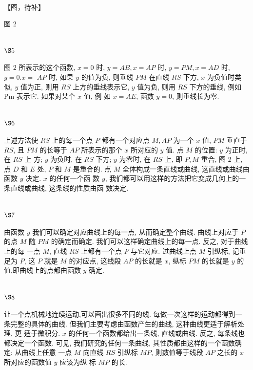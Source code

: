 【图，待补】

图 2

\section{$\S 5$}

图 2 所表示的这个函数, $x=0$ 时, $y=A B, x=A P$ 时, $y=P M, x=A D$ 时, $y=0 . x=$ $A P$ 时, 如果 $y$ 的值为负, 则垂线 $P M$ 在直线 $R S$ 下方, $x$ 为负值时类似, $y$ 值为正, 则用 $R S$ 上方的垂线表示它, $y$ 值为负, 则用 $R S$ 下方的垂线, 例如 Pm 表示它. 如果对某个 $x$ 值, 例 如 $x=A E$, 函数 $y=0$, 则垂线长为零.

\section{$\S 6$}

上述方法使 $R S$ 上的每一个点 $P$ 都有一个对应点 $M, A P$ 为一个 $x$ 值, $P M$ 垂直于 $R S$, 且 $P M$ 的长等于 $A P$ 所表示的那个 $x$ 所对应的 $y$ 值. 点 $M$ 的位置: $y$ 为正时,在 $R S$ 上 方; $y$ 为负时, 在 $R S$ 下方; $y$ 为零时, 在 $R S$ 上, 即 $P, M$ 重合, 图 2 上, 点 $D$ 和 $E$ 处, $P$ 和 $M$ 是重合的. 点 $M$ 全体构成一条直线或曲线, 这直线或曲线由函数 $y$ 决定. $x$ 的任何一个函 数 $y$, 我们都可以用这样的方法把它变成几何上的一条直线或曲线, 这条线的性质由函 数决定.

\section{$\S 7$}

由函数 $y$ 我们可以确定对应曲线上的每一点, 从而确定整个曲线. 曲线上对应于 $P$ 的点 $M$ 随 $P M$ 的确定而确定. 我们可以这样确定曲线上的每一点. 反之, 对于曲线上的每 一点 $M$, 直线 $R S$ 上都有一个点 $P$ 与它对应. 过曲线上点 $M$ 引纵标, 记垂足为 $P$, 这 $P$ 就是 $M$ 的对应点, 这线段 $A P$ 的长就是 $x$, 纵标 $P M$ 的长就是 $y$ 的值,即曲线上的点都由函数 $y$ 确定.

\section{$\S 8$}

让一个点机械地连续运动,可以画出很多不同的线. 每做一次这样的运动都得到一 条完整的具体的曲线. 但我们主要考虑由函数产生的曲线, 这种曲线更适于解析处理, 更 适于微积分. $x$ 的任何一个函数都给出一条线, 直线或曲线. 反之, 每条线也都决定一个函数. 可见, 我们研究的任何一条曲线, 其性质都由这样的一个函数确定: 从曲线上任意 一点 $M$ 向直线 $R S$ 引纵标 $M P$, 则数值等于线段 $A P$ 之长的 $x$ 所对应的函数值 $y$ 应该为纵 标 $M P$ 的长.


